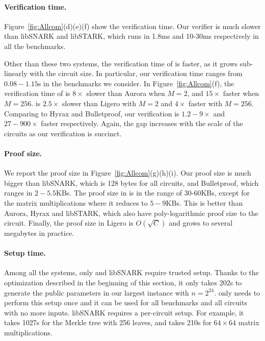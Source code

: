 \paragraph{Verification time.} Figure~\ref{fig:Allcom}(d)(e)(f) show the verification time. Our verifier is much slower than \textsf{libSNARK} and \textsf{libSTARK}, which runs in 1.8ms and 10-30ms respectively in all the benchmarks. 

Other than these two systems, the verification time of \name is faster, as it grows sub-linearly with the circuit size. In particular, our verification time ranges from $0.08-1.15$s in the benchmarks we consider. In Figure~\ref{fig:Allcom}(f), the verification time of \name is $8\times$ slower than \textsf{Aurora} when $M=2$, and $15\times$ faster when $M=256$. \name is $2.5\times$ slower than \textsf{Ligero} with $M=2$ and $4\times$ faster with $M=256$. Comparing to \textsf{Hyrax} and \textsf{Bulletproof}, our verification is $1.2-9\times$ and $27-900\times$ faster respectively. Again, the gap increases with the scale of the circuits as our verification is succinct.

\paragraph{Proof size.} We report the proof size in Figure~\ref{fig:Allcom}(g)(h)(i). Our proof size is much bigger than \textsf{libSNARK}, which is 128 bytes for all circuits, and \textsf{Bulletproof}, which ranges in $2-5.5$KBs. The proof size in \name is in the range of 30-60KBs, except for the matrix multiplications where it reduces to $5-9$KBs. This is better than \textsf{Aurora}, \textsf{Hyrax} and \textsf{libSTARK}, which also have poly-logarithmic proof size to the circuit. Finally, the proof size in \textsf{Ligero} is $O(\sqrt{C})$ and grows to several megabytes in practice.

\paragraph{Setup time.} Among all the systems, only \name and \textsf{libSNARK} require trusted setup. Thanks to the optimization described in the beginning of this section, it only takes 202s to generate the public parameters in our largest instance with $n = 2^{24}$. \name only needs to perform this setup once and it can be used for all benchmarks and all circuits with no more inputs. \textsf{libSNARK} requires a per-circuit setup. For example, it takes 1027s for the Merkle tree with 256 leaves, and takes 210s for $64\times 64$ matrix multiplications.


